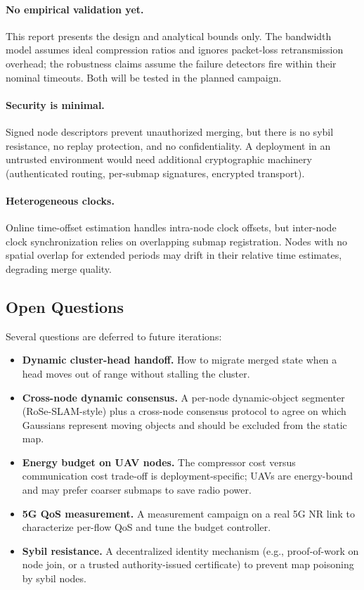 \paragraph{No empirical validation yet.} This report presents the design and
analytical bounds only. The bandwidth model assumes ideal compression ratios
and ignores packet-loss retransmission overhead; the robustness claims assume
the failure detectors fire within their nominal timeouts. Both will be tested
in the planned campaign.

\paragraph{Security is minimal.} Signed node descriptors prevent unauthorized
merging, but there is no sybil resistance, no replay protection, and no
confidentiality. A deployment in an untrusted environment would need
additional cryptographic machinery (authenticated routing, per-submap
signatures, encrypted transport).

\paragraph{Heterogeneous clocks.} Online time-offset estimation handles
intra-node clock offsets, but inter-node clock synchronization relies on
overlapping submap registration. Nodes with no spatial overlap for extended
periods may drift in their relative time estimates, degrading merge quality.

\subsection{Open Questions}

Several questions are deferred to future iterations:

\begin{itemize}
  \item \textbf{Dynamic cluster-head handoff.} How to migrate merged state
    when a head moves out of range without stalling the cluster.
  \item \textbf{Cross-node dynamic consensus.} A per-node dynamic-object
    segmenter (RoSe-SLAM-style) plus a cross-node consensus protocol to agree
    on which Gaussians represent moving objects and should be excluded from
    the static map.
  \item \textbf{Energy budget on UAV nodes.} The compressor cost versus
    communication cost trade-off is deployment-specific; UAVs are energy-bound
    and may prefer coarser submaps to save radio power.
  \item \textbf{5G QoS measurement.} A measurement campaign on a real 5G NR
    link to characterize per-flow QoS and tune the budget controller.
  \item \textbf{Sybil resistance.} A decentralized identity mechanism
    (e.g., proof-of-work on node join, or a trusted authority-issued
    certificate) to prevent map poisoning by sybil nodes.
\end{itemize}
